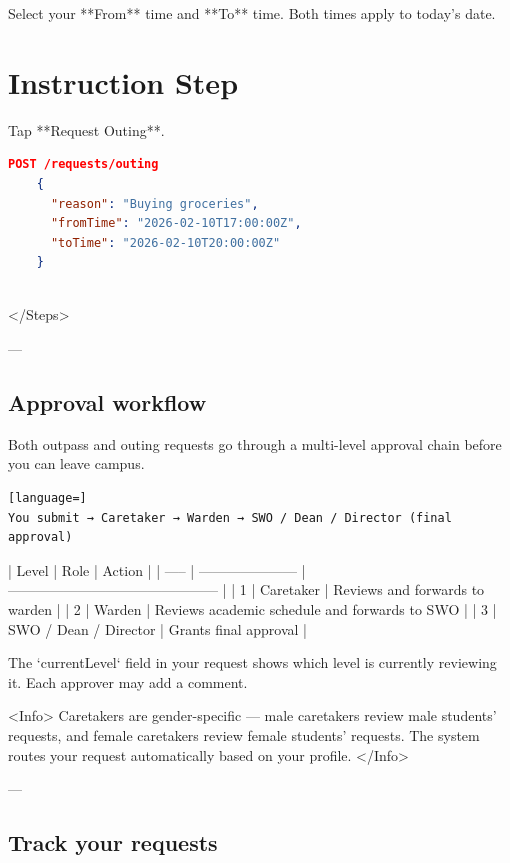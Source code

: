     Select your **From** time and **To** time. Both times apply to today's date.
  
  
\section{Instruction Step}

    Tap **Request Outing**.

    \begin{lstlisting}[language=json]
    POST /requests/outing
    {
      "reason": "Buying groceries",
      "fromTime": "2026-02-10T17:00:00Z",
      "toTime": "2026-02-10T20:00:00Z"
    }
    
\end{lstlisting}

  
</Steps>

---

\subsection{Approval workflow}

Both outpass and outing requests go through a multi-level approval chain before you can leave campus.

\begin{lstlisting}[language=]
You submit → Caretaker → Warden → SWO / Dean / Director (final approval)

\end{lstlisting}

| Level | Role                  | Action                                        |
| ----- | --------------------- | --------------------------------------------- |
| 1     | Caretaker             | Reviews and forwards to warden                |
| 2     | Warden                | Reviews academic schedule and forwards to SWO |
| 3     | SWO / Dean / Director | Grants final approval                         |

The `currentLevel` field in your request shows which level is currently reviewing it. Each approver may add a comment.

<Info>
  Caretakers are gender-specific — male caretakers review male students'
  requests, and female caretakers review female students' requests. The system
  routes your request automatically based on your profile.
</Info>

---

\subsection{Track your requests}


